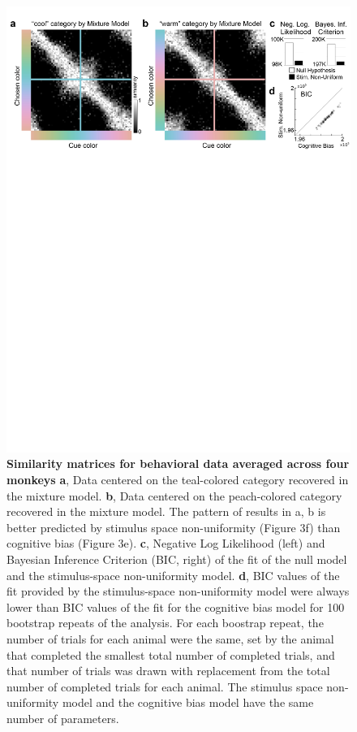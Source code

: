 \begin{figure}
    \begin{fullwidth}
    \centering
    \includegraphics[width=\textwidth+4cm,trim={0 19cm 0 0},clip]{../Figures/flat/F4_TCCResults_4.jpg}
    \caption{\textbf{Similarity matrices for behavioral data averaged across four monkeys}
    \textbf{a}, Data centered on the teal-colored category recovered in the mixture model.  
	\textbf{b}, Data centered on the peach-colored category recovered in the mixture model. The pattern of results in a, b is better predicted by stimulus space non-uniformity (Figure 3f) than cognitive bias (Figure 3e). 
	\textbf{c}, Negative Log Likelihood (left) and Bayesian Inference Criterion (BIC, right) of the fit of the null model and the stimulus-space non-uniformity model. 
	\textbf{d}, BIC values of the fit provided by the stimulus-space non-uniformity model were always lower than BIC values of the fit for the cognitive bias model for 100 bootstrap repeats of the analysis. For each boostrap repeat, the number of trials for each animal were the same, set by the animal that completed the smallest total number of completed trials, and that number of trials was drawn with replacement from the total number of completed trials for each animal. The stimulus space non-uniformity model and the cognitive bias model have the same number of parameters. 
    } 
    \label{fig:TCCOutput}
    \end{fullwidth}
\end{figure}


